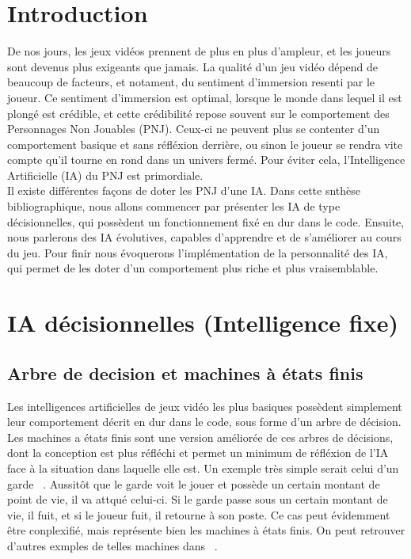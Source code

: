 \documentclass[asi]{picINSA}
\begin{document}
	
	\couverture{}

\tableofcontents{}

\chapter{Introduction}
De nos jours, les jeux vidéos prennent de plus en plus d'ampleur, et les joueurs sont devenus plus exigeants que jamais. La qualité d'un jeu vidéo dépend de beaucoup de facteurs, et notament, du sentiment d'immersion resenti par le joueur. Ce sentiment d'immersion est optimal, lorsque le monde dans lequel il est plongé est crédible, et cette crédibilité repose souvent sur le comportement des Personnages Non Jouables (PNJ). Ceux-ci ne peuvent plus se contenter d'un comportement basique et sans réfléxion derrière, ou sinon le joueur se rendra vite compte qu'il tourne en rond dans un univers fermé. Pour éviter cela, l'Intelligence Artificielle (IA) du PNJ est primordiale. \\
Il existe différentes façons de doter les PNJ d'une IA. Dans cette snthèse bibliographique, nous allons commencer par présenter les IA de type décisionnelles, qui possèdent un fonctionnement fixé en dur dans le code. Ensuite, nous parlerons des IA évolutives, capables d'apprendre et de s'améliorer au cours du jeu. Pour finir nous évoquerons l'implémentation de la personnalité des IA, qui permet de les doter d'un comportement plus riche et plus vraisemblable.


\chapter{IA décisionnelles (Intelligence fixe)}
\section{Arbre de decision et machines à états finis}
Les intelligences artificielles de jeux vidéo les plus basiques possèdent simplement leur comportement décrit en dur dans le code, sous forme d’un arbre de décision. \\
Les machines a états finis sont une version améliorée de ces arbres de décisions, dont la conception est plus réfléchi et permet un minimum de réfléxion de l'IA face à la situation dans laquelle elle est. Un exemple très simple serait celui d'un garde ~\cite{MindGames}. Aussitôt que le garde voit le jouer et possède un certain montant de point de vie, il va attqué celui-ci. Si le garde passe sous un certain montant de vie, il fuit, et si le joueur fuit, il retourne à son poste. Ce cas peut évidemment être conplexifié, mais représente bien les machines à états finis. On peut retrouver d'autres exmples de telles machines dans ~\cite{khoo2002applying}.\\
\end{document}
